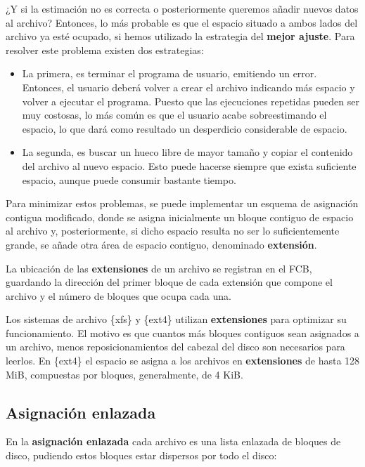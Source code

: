 ¿Y si la estimación no es correcta o posteriormente queremos añadir
nuevos datos al archivo? Entonces, lo más probable es que el espacio
situado a ambos lados del archivo ya esté ocupado, si hemos utilizado la
estrategia del \textbf{mejor ajuste}. Para resolver este problema
existen dos estrategias:

\begin{itemize}
\item
  La primera, es terminar el programa de usuario, emitiendo un error.
  Entonces, el usuario deberá volver a crear el archivo indicando más
  espacio y volver a ejecutar el programa. Puesto que las ejecuciones
  repetidas pueden ser muy costosas, lo más común es que el usuario
  acabe sobreestimando el espacio, lo que dará como resultado un
  desperdicio considerable de espacio.
\item
  La segunda, es buscar un hueco libre de mayor tamaño y copiar el
  contenido del archivo al nuevo espacio. Esto puede hacerse siempre que
  exista suficiente espacio, aunque puede consumir bastante tiempo.
\end{itemize}

Para minimizar estos problemas, se puede implementar un esquema de
asignación contigua modificado, donde se asigna inicialmente un bloque
contiguo de espacio al archivo y, posteriormente, si dicho espacio
resulta no ser lo suficientemente grande, se añade otra área de espacio
contiguo, denominado \textbf{{}extensión}.

La ubicación de las \textbf{extensiones} de un archivo se registran en
el FCB, guardando la dirección del primer bloque de cada extensión que
compone el archivo y el número de bloques que ocupa cada una.

Los sistemas de archivo \{xfs\} y \{ext4\} utilizan \textbf{extensiones}
para optimizar su funcionamiento. El motivo es que cuantos más bloques
contiguos sean asignados a un archivo, menos reposicionamientos del
cabezal del disco son necesarios para leerlos. En \{ext4\} el espacio se
asigna a los archivos en \textbf{extensiones} de hasta 128 MiB,
compuestas por bloques, generalmente, de 4 KiB.

\subsection{Asignación enlazada}\label{_asignaciuxf3n_enlazada}

{} En la \textbf{asignación enlazada} cada archivo es una lista enlazada
de bloques de disco, pudiendo estos bloques estar dispersos por todo el
disco:

